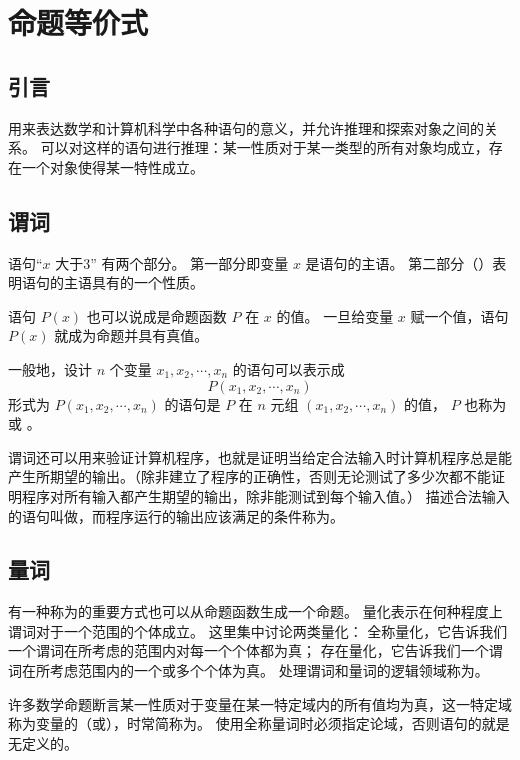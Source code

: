 
\section{命题等价式}
{
    \subsection{引言}
    {
        用来表达数学和计算机科学中各种语句的意义，并允许推理和探索对象之间的关系。
        可以对这样的语句进行推理：某一性质对于某一类型的所有对象均成立，存在一个对象使得某一特性成立。
    }

    \subsection{谓词}
    {
        语句``$x$ 大于3'' 有两个部分。
        第一部分即变量 $x$ 是语句的主语。
        第二部分（）表明语句的主语具有的一个性质。

        语句 $P(x)$ 也可以说成是命题函数 $P$ 在 $x$ 的值。
        一旦给变量 $x$ 赋一个值，语句 $P(x)$ 就成为命题并具有真值。

        一般地，设计 $n$ 个变量 $x_1, x_2, \cdots, x_n$ 的语句可以表示成
        $$P(x_1, x_2, \cdots, x_n)$$
        形式为 $P(x_1, x_2, \cdots, x_n)$ 的语句是  $P$ 在 $n$ 元组 $(x_1, x_2, \cdots, x_n)$ 的值， $P$ 也称为 或 。 

        {
            谓词还可以用来验证计算机程序，也就是证明当给定合法输入时计算机程序总是能产生所期望的输出。（除非建立了程序的正确性，否则无论测试了多少次都不能证明程序对所有输入都产生期望的输出，除非能测试到每个输入值。）
            描述合法输入的语句叫做，而程序运行的输出应该满足的条件称为。
        }
    }

    \subsection{量词}
    {
        有一种称为的重要方式也可以从命题函数生成一个命题。
        量化表示在何种程度上谓词对于一个范围的个体成立。
        这里集中讨论两类量化：
        全称量化，它告诉我们一个谓词在所考虑的范围内对每一个个体都为真；
        存在量化，它告诉我们一个谓词在所考虑范围内的一个或多个个体为真。
        处理谓词和量词的逻辑领域称为。

        {
            许多数学命题断言某一性质对于变量在某一特定域内的所有值均为真，这一特定域称为变量的（或），时常简称为。
            使用全称量词时必须指定论域，否则语句的就是无定义的。

}}}
